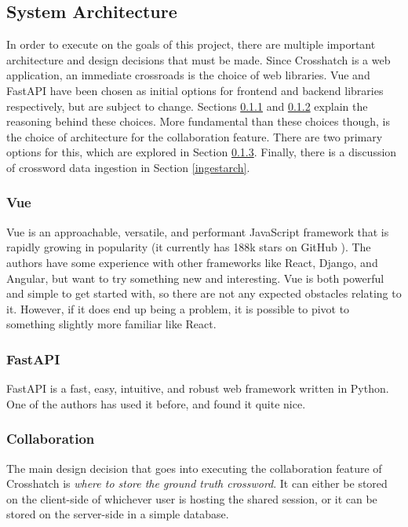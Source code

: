 \documentclass{article}
\begin{document}
\subsection{System Architecture}

In order to execute on the goals of this project, there are multiple important architecture and design decisions that must be made.
Since Crosshatch
is a web application, an immediate crossroads is the choice of web libraries. Vue and FastAPI have been chosen
as initial options for frontend and backend libraries respectively, but are subject to change. Sections \ref{vue}
and \ref{fastapi} explain the reasoning behind these choices.
More fundamental than these choices though, is the choice of architecture for the collaboration feature. There are two primary
options for this, which are explored in Section \ref{collabarch}. Finally, there is a discussion of crossword data ingestion in
Section \ref{ingestarch}.

\subsubsection{Vue}
\label{vue}
Vue \cite{vue} is an approachable, versatile, and performant JavaScript framework that is rapidly growing
in popularity (it currently has 188k stars on GitHub \cite{vuegithub}). The authors have some experience
with other frameworks like React, Django, and Angular, but want to try something new and interesting.
Vue is both powerful and simple to get started with, so there are not any expected obstacles
relating to it. However, if it does end up being a problem, it is possible to pivot to something
slightly more familiar like React.

\subsubsection{FastAPI}
\label{fastapi}
FastAPI \cite{fastapi} is a fast, easy, intuitive, and robust web framework written in Python. One of the authors
has used it before, and found it quite nice.

\subsubsection{Collaboration}
\label{collabarch}
The main design decision that goes into executing the collaboration feature of Crosshatch is \textit{where to
  store the ground truth crossword}. It can either be stored on the client-side of whichever user is
hosting the shared session, or it can be stored on the server-side in a simple database.
\end{document}
